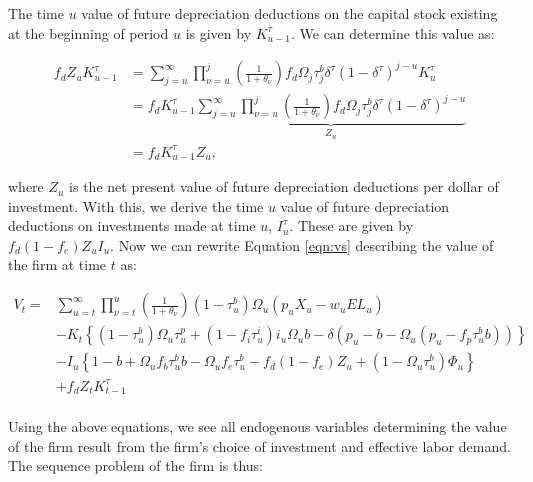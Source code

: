 The time $u$ value of future depreciation deductions on the capital stock existing at the beginning of period $u$ is given by $K^{\tau}_{u-1}$.  We can determine this value as:

\begin{equation}
\label{eqn:z}
\begin{split}
f_{d}Z_{u}K^{\tau}_{u-1} &=  \sum^{\infty}_{j=u} \prod_{\nu=u}^{j} \left(\frac{1}{1+\theta_{\nu}}\right)f_{d}\Omega_{j}\tau^{b}_{j}\delta^{\tau}(1-\delta^{\tau})^{j-u}K^{\tau}_{u} \\
&= f_{d} K^{\tau}_{u-1} \underbrace{\sum^{\infty}_{j=u} \prod_{\nu=u}^{j} \left(\frac{1}{1+\theta_{\nu}}\right)f_{d}\Omega_{j}\tau^{b}_{j}\delta^{\tau}(1-\delta^{\tau})^{j-u}}_{Z_{u}} \\
& = f_{d} K^{\tau}_{u-1} Z_{u},
\end{split}
\end{equation}

\noindent\noindent where $Z_{u}$ is the net present value of future depreciation deductions per dollar of investment.  With this, we derive the time $u$ value of future depreciation deductions on investments made at time $u$, $I^{\tau}_{u}$.  These are given by $f_{d}(1-f_{e})Z_{u}I_{u}$.  Now we can rewrite Equation \ref{eqn:vs} describing the value of the firm at time $t$ as: 

 \begin{equation}
\label{eqn:vs_w_z}
\begin{split}
V_{t} = &  \sum_{u=t}^{\infty} \prod_{\nu=t}^{u}\left(\frac{1}{1+\theta_{\nu}}\right) (1-\tau^{b}_{u})\Omega_{u}(p_{u}X_{u}-w_{u}EL_{u})  \\ 
 & - K_{t} \left\{(1-\tau^{b}_{u})\Omega_{u}\tau^{p}_{u}+(1-f_{i}\tau^{i}_{u})i_{u}\Omega_{u}b-\delta(p_{u}-b-\Omega_{u}(p_{u}-f_{p}\tau^{b}_{u}b))\right\}  \\
 & - I_{u}\left\{1-b+\Omega_{u}f_{b}\tau^{b}_{u}b-\Omega_{u}f_{e}\tau^{b}_{u} - f_{d}(1-f_{e})Z_{u} + (1-\Omega_{u}\tau^{b}_{u})\Phi_{u}\right\} \\
 &  + f_{d}Z_{t}K^{\tau}_{t-1} \\
\end{split}
\end{equation}

Using the above equations, we see all endogenous variables determining the value of the firm result from the firm's choice of investment and effective labor demand. The sequence problem of the firm is thus: 

